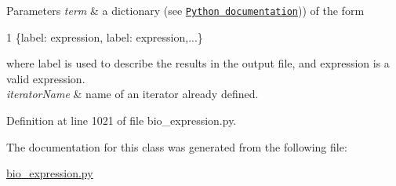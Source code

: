 \begin{DoxyParams}{Parameters}
{\em term} & a dictionary (see \href{http://docs.python.org/py3k/tutorial/datastructures.html}{\tt Python documentation})) of the form 
\begin{DoxyCode}
1 \{label: expression, label: expression,...\}
\end{DoxyCode}
 where label is used to describe the results in the output file, and expression is a valid expression. \\
\hline
{\em iterator\+Name} & name of an iterator already defined. \\
\hline
\end{DoxyParams}


Definition at line 1021 of file bio\+\_\+expression.\+py.



The documentation for this class was generated from the following file\+:\begin{DoxyCompactItemize}
\item 
\hyperlink{bio__expression_8py}{bio\+\_\+expression.\+py}\end{DoxyCompactItemize}
